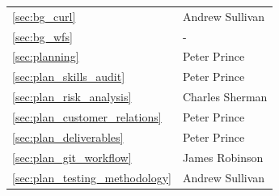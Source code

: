 \documentclass[a4paper, 12pt, twoside]{article}
\newcommand*{\fullref}[1]{\ref{#1} \nameref{#1}}
\begin{document}
\begin{tabularx}{\textwidth}{|X|X|}
  \fullref{sec:bg_curl}                  & Andrew Sullivan                    \\
  \fullref{sec:bg_wfs}                   & -                                  \\ \hline
  \fullref{sec:planning}                 & Peter Prince                       \\
  \fullref{sec:plan_skills_audit}        & Peter Prince                       \\
  \fullref{sec:plan_risk_analysis}       & Charles Sherman                    \\
  \fullref{sec:plan_customer_relations}  & Peter Prince                       \\
  \fullref{sec:plan_deliverables}        & Peter Prince    \\
  \fullref{sec:plan_git_workflow}        & James Robinson                     \\
  \fullref{sec:plan_testing_methodology} & Andrew Sullivan                    \\ \hline
\end{tabularx}
\newpage
\end{document}
